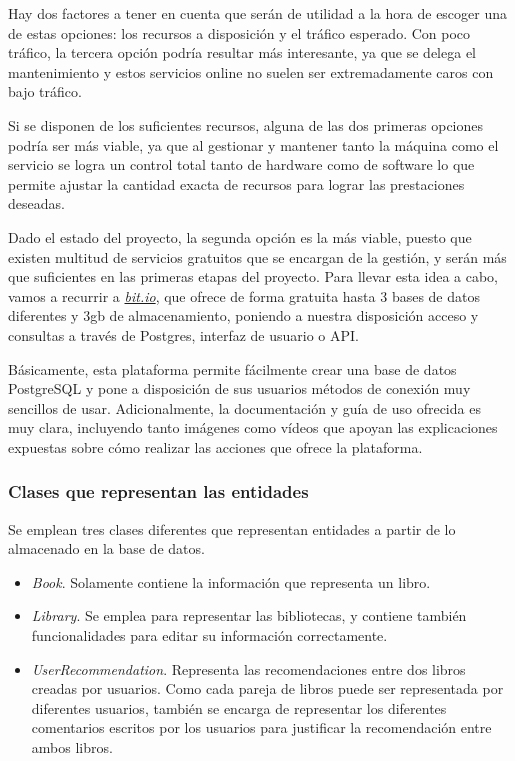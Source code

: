 Hay dos factores a tener en cuenta que serán de utilidad a la hora de escoger una de estas opciones: los recursos a disposición y el tráfico esperado. Con poco tráfico, la tercera opción podría resultar más interesante, ya que se delega el mantenimiento y estos servicios online no suelen ser extremadamente caros con bajo tráfico.

Si se disponen de los suficientes recursos, alguna de las dos primeras opciones podría ser más viable, ya que al gestionar y mantener tanto la máquina como el servicio se logra un control total tanto de hardware como de software lo que permite ajustar la cantidad exacta de recursos para lograr las prestaciones deseadas.

Dado el estado del proyecto, la segunda opción es la más viable, puesto que existen multitud de servicios gratuitos que se encargan de la gestión, y serán más que suficientes en las primeras etapas del proyecto. Para llevar esta idea a cabo, vamos a recurrir a \href{https://bit.io/}{\textit{bit.io}}, que ofrece de forma gratuita hasta 3 bases de datos diferentes y 3gb de almacenamiento, poniendo a nuestra disposición acceso y consultas a través de Postgres, interfaz de usuario o API.

Básicamente, esta plataforma permite fácilmente crear una base de datos PostgreSQL y pone a disposición de sus usuarios métodos de conexión muy sencillos de usar. Adicionalmente, la documentación y guía de uso ofrecida es muy clara, incluyendo tanto imágenes como vídeos que apoyan las explicaciones expuestas sobre cómo realizar las acciones que ofrece la plataforma.

\subsubsection{Clases que representan las entidades}

Se emplean tres clases diferentes que representan entidades a partir de lo almacenado en la base de datos.

\begin{itemize}
    \item \textit{Book}. Solamente contiene la información que representa un libro.
    \item \textit{Library}. Se emplea para representar las bibliotecas, y contiene también funcionalidades para editar su información correctamente.
    \item \textit{UserRecommendation}. Representa las recomendaciones entre dos libros creadas por usuarios. Como cada pareja de libros puede ser representada por diferentes usuarios, también se encarga de representar los diferentes comentarios escritos por los usuarios para justificar la recomendación entre ambos libros.
\end{itemize}

